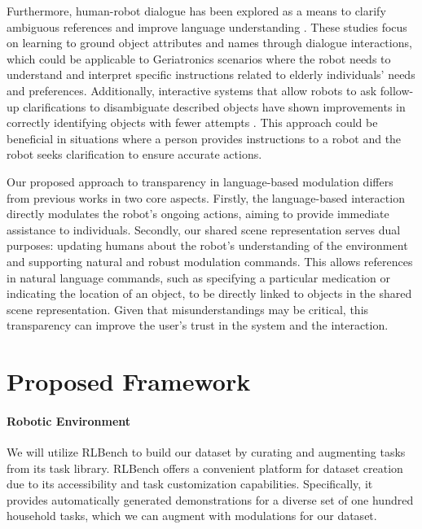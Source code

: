\documentclass[journal]{IEEEtran}
\begin{document}
Furthermore, human-robot dialogue has been explored as a means to clarify 
ambiguous references and improve language understanding 
\cite{vogel2010eye,parde2015grounding,thomason2016learning,yang2018visual}. 
These studies focus on learning to ground object attributes and names through 
dialogue interactions, which could be applicable to Geriatronics scenarios 
where the robot needs to understand and interpret specific instructions 
related to elderly individuals' needs and preferences. Additionally, 
interactive systems that allow robots to ask follow-up clarifications to 
disambiguate described objects have shown improvements in correctly identifying 
objects with fewer attempts \cite{dogan2022asking}. This approach could be beneficial in situations 
where a person provides instructions to a robot and the robot seeks 
clarification to ensure accurate actions.

Our proposed approach to transparency in language-based modulation differs 
from previous works in two core aspects. Firstly, the language-based interaction 
directly modulates the robot's ongoing actions, aiming to provide immediate 
assistance to individuals. Secondly, our shared scene 
representation serves dual purposes: updating humans about the robot's 
understanding of the environment and supporting natural and robust modulation 
commands. This allows references in natural language commands, such as 
specifying a particular medication or indicating the location of an object,
to be directly linked to objects in the shared scene representation. 
Given that misunderstandings may be critical, this transparency can improve
the user's trust in the system and the interaction. 

\section{Proposed Framework}

\paragraph*{Robotic Environment}


We will utilize RLBench \cite{james2020rlbench} to build our 
dataset by curating and augmenting tasks from its task library.
RLBench offers a convenient platform for dataset creation due to 
its accessibility and task customization capabilities. 
Specifically, it provides automatically generated demonstrations
for a diverse set of one hundred household tasks, which we can 
augment with modulations for our dataset.
\end{document}
